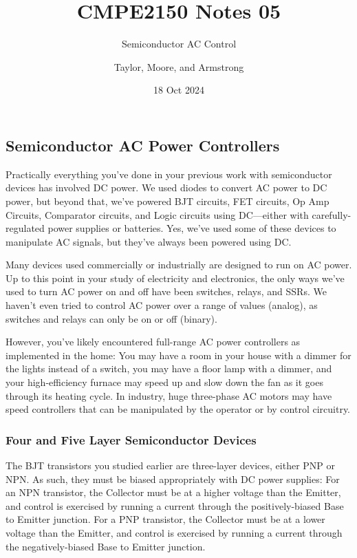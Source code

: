 \documentclass[
  letterpaper,
  DIV=11,
  numbers=noendperiod,
  oneside]{scrartcl}
\title{CMPE2150 Notes 05}
\subtitle{Semiconductor AC Control}
\author{Taylor, Moore, and Armstrong}
\date{18 Oct 2024}
\renewcommand*\contentsname{Table of contents}
\newcommand\contentsname{Table of contents}
\begin{document}
\maketitle

\renewcommand*\contentsname{Table of contents}
{
\hypersetup{linkcolor=}
\setcounter{tocdepth}{3}
\tableofcontents
}

\subsection{Semiconductor AC Power
Controllers}\label{semiconductor-ac-power-controllers}

Practically everything you've done in your previous work with
semiconductor devices has involved DC power. We used diodes to convert
AC power to DC power, but beyond that, we've powered BJT circuits, FET
circuits, Op Amp Circuits, Comparator circuits, and Logic circuits using
DC---either with carefully-regulated power supplies or batteries. Yes,
we've used some of these devices to manipulate AC signals, but they've
always been powered using DC.

Many devices used commercially or industrially are designed to run on AC
power. Up to this point in your study of electricity and electronics,
the only ways we've used to turn AC power on and off have been switches,
relays, and SSRs. We haven't even tried to control AC power over a range
of values (analog), as switches and relays can only be on or off
(binary).

However, you've likely encountered full-range AC power controllers as
implemented in the home: You may have a room in your house with a dimmer
for the lights instead of a switch, you may have a floor lamp with a
dimmer, and your high-efficiency furnace may speed up and slow down the
fan as it goes through its heating cycle. In industry, huge three-phase
AC motors may have speed controllers that can be manipulated by the
operator or by control circuitry.

\subsubsection{Four and Five Layer Semiconductor
Devices}\label{four-and-five-layer-semiconductor-devices}

The BJT transistors you studied earlier are three-layer devices, either
PNP or NPN. As such, they must be biased appropriately with DC power
supplies: For an NPN transistor, the Collector must be at a higher
voltage than the Emitter, and control is exercised by running a current
through the positively-biased Base to Emitter junction. For a PNP
transistor, the Collector must be at a lower voltage than the Emitter,
and control is exercised by running a current through the
negatively-biased Base to Emitter junction.
\end{document}

